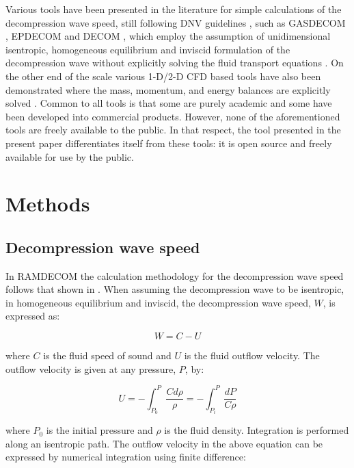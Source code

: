 \documentclass[a4paper, 10pt, twocolumn, twoside]{scrartcl}
\begin{document}
Various tools have been presented in the literature for simple calculations of the decompression wave speed, still following DNV guidelines \cite{dnv}, such as GASDECOM \cite{Cosham_GASDECOM}, EPDECOM \cite{Lu2012_EPDECOM} and DECOM \cite{Cosham_DECOM}, which employ the assumption of unidimensional isentropic, homogeneous equilibrium and inviscid formulation of the decompression wave without explicitly
solving the fluid transport equations \cite{Liu_2017}. On the other end of the scale  various 1-D/2-D CFD based tools have also been demonstrated where the mass, momentum, and energy balances are explicitly solved \cite{Xu2014_CFDDECOM,OKE20034591_pipetech_CFD,ELSHAHOMI201520_CFD,Fang2019}. Common to all tools is that some are purely academic and some have been developed into commercial products. However, none of the aforementioned tools are freely available to the public. In that respect, the tool presented in the present paper differentiates itself from these tools: it is open source and freely available for use by the public. 

\section{Methods}

\subsection{Decompression wave speed}
In RAMDECOM the calculation methodology for the decompression wave speed follows that shown in \cite{GU2018237,Hu2021}. When assuming the decompression wave to be isentropic, in  homogeneous equilibrium and inviscid, the decompression wave speed, $W$, is expressed as:

\begin{equation}\label{eqn:decompression}
W = C - U 
\end{equation}

where $C$ is the fluid speed of sound and $U$ is the fluid outflow velocity. The outflow velocity is given at any pressure, $P$, by:

\begin{equation}\label{eqn:outflow}
U = -\int_{P_0}^{P}{\frac{Cd\rho}{\rho}} = -\int_{P_i}^{P}{\frac{dP}{C\rho}}
\end{equation}

where $P_0$ is the initial pressure and $\rho$ is the fluid density. Integration is performed along an isentropic path. The outflow velocity in the above equation can be expressed by numerical integration using finite difference:
\end{document}
